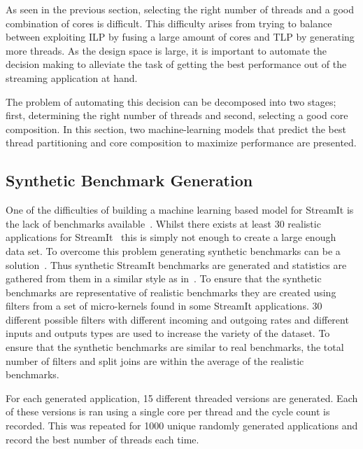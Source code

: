As seen in the previous section, selecting the right number of threads and a good combination of cores is difficult.
This difficulty arises from trying to balance between exploiting ILP by fusing a large amount of cores and TLP by generating more threads.
As the design space is large, it is important to automate the decision making to alleviate the task of getting the best performance out of the streaming application at hand.

The problem of automating this decision can be decomposed into two stages; first, determining the right number of threads and second, selecting a good core composition.
In this section, two machine-learning models that predict the best thread partitioning and core composition to maximize performance are presented.

\subsection{Synthetic Benchmark Generation}

One of the difficulties of building a machine learning based model for StreamIt is the lack of benchmarks available~\cite{wang2013partitionstreamit}.
Whilst there exists at least 30 realistic applications for StreamIt~\cite{theis2010empericalcharstreamit} this is simply not enough to create a large enough data set.
To overcome this problem generating synthetic benchmarks can be a solution~\cite{cumminsopencl2017}.
Thus synthetic StreamIt benchmarks are generated and statistics are gathered from them in a similar style as in~\cite{wang2013partitionstreamit}.
To ensure that the synthetic benchmarks are representative of realistic benchmarks they are created using filters from a set of micro-kernels found in some StreamIt applications.
30 different possible filters with different incoming and outgoing rates and different inputs and outputs types are used to increase the variety of the dataset.
To ensure that the synthetic benchmarks are similar to real benchmarks, the total number of filters and split joins are within the average of the realistic benchmarks.

For each generated application, 15 different threaded versions are generated.
Each of these versions is ran using a single core per thread and the cycle count is recorded.
This was repeated for 1000 unique randomly generated applications and record the best number of threads each time.

